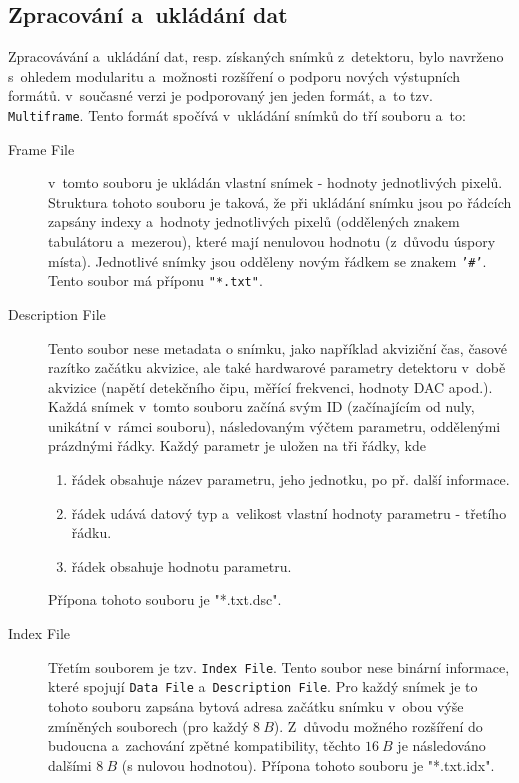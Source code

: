\subsection{Zpracování a~ukládání dat}\label{atlas:cont:output}
Zpracovávání a~ukládání dat, resp. získaných snímků z~detektoru, bylo navrženo s~ohledem modularitu a~možnosti rozšíření o podporu nových výstupních formátů. v~současné verzi je podporovaný jen jeden formát, a~to tzv. \texttt{Multiframe}. Tento formát spočívá v~ukládání snímků do tří souboru a~to:
\begin{description}
	\item[Frame File] v~tomto souboru je ukládán vlastní snímek - hodnoty jednotlivých pixelů. Struktura tohoto souboru je taková, že při ukládání snímku jsou po řádcích zapsány indexy a~hodnoty jednotlivých pixelů (oddělených znakem tabulátoru a~mezerou), které mají nenulovou hodnotu (z~důvodu úspory místa). Jednotlivé snímky jsou odděleny novým řádkem se znakem \texttt{'\#'}. Tento soubor má příponu \texttt{"*.txt"}.
	\item[Description File] Tento soubor nese metadata o snímku, jako například akviziční čas, časové razítko začátku akvizice, ale také hardwarové parametry detektoru v~době akvizice (napětí detekčního čipu, měřící frekvenci, hodnoty DAC apod.). Každá snímek v~tomto souboru začíná svým ID (začínajícím od nuly, unikátní v~rámci souboru), následovaným výčtem parametru, oddělenými prázdnými řádky. Každý parametr je uložen na tři řádky, kde
		\begin{enumerate}
			\item řádek obsahuje název parametru, jeho jednotku, po př. další informace.
			\item řádek udává datový typ a~velikost vlastní hodnoty parametru - třetího řádku.
			\item řádek obsahuje hodnotu parametru.
		\end{enumerate}
	Přípona tohoto souboru je "*.txt.dsc".
	\item[Index File] Třetím souborem je tzv. \texttt{Index File}. Tento soubor nese binární informace, které spojují \texttt{Data File} a~\texttt{Description File}. Pro každý snímek je to tohoto souboru zapsána bytová adresa začátku snímku v~obou výše zmíněných souborech (pro každý $8~B$). Z~důvodu možného rozšíření do budoucna a~zachování zpětné kompatibility, těchto $16~B$ je následováno dalšími $8~B$ (s nulovou hodnotou). Přípona tohoto souboru je "*.txt.idx".
\end{description}

